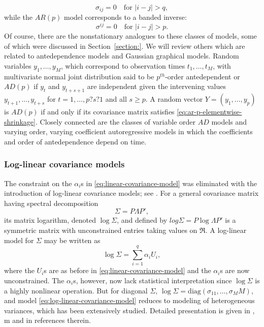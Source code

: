 \documentclass[12pt]{article}
\theoremstyle{definition}
\begin{document}
{{\begin{equation}  \label{eq:ar-p-elementwise-shrinkage}
\sigma_{ij} = 0 \quad \mbox{for }\vert i - j \vert > q, 
\end{equation}
\noindent
while the $AR(p)$ model corresponds to a banded inverse:
\begin{equation} \label{eq:ar-p-elementwise-shrinkage}
\sigma^{ij} = 0 \quad \mbox{for }\vert i - j \vert > p. 
\end{equation}
Of course, there are the nonstationary analogues to these classes of models, some of which were discussed in Section~\ref{section:}. We will review others which are related to antedependence models and Gaussian graphical models. Random variables $y_1, \dots, y_M$, which correspond to observation times $t_1,\dots, t_M$, with multivariate normal joint distribution said to be $p^{th}$-order antedependent or $AD(p)$ \citet{gabriel1962ante} if $y_t$ and $y_{t+s+1}$ are independent given the intervening values $y_{t+1}, \dots , y_{t+s}$ for $t = 1, \dots , p?s?1$ and all $s \ge p$. A random vector $Y = \left(y_1, \dots , y_p\right)$ is $AD(p)$ if and only if its covariance matrix satisfies \ref{eq:ar-p-elementwise-shrinkage}. Closely connected are the classes of variable order $AD$ models and varying order, varying coefficient autoregressive models \citet{kitagawa1985smoothness} in which the coefficients and order of antedependence depend on time. 

\subsubsection{Log-linear covariance models}

The constraint on the $\alpha_i$s in \ref{eq:linear-covariance-model} was eliminated with the introduction of log-linear covariance models; see \citet{chiu1996matrix}. For a general covariance matrix having spectral decomposition
\begin{equation}
\Sigma = P \Lambda P',
\end{equation}
\noindent
its matrix logarithm, denoted $\log\Sigma$, and defined by $log \Sigma = P \log\Lambda P'$ is a symmetric matrix with unconstrained entries taking values on $\Re$. A log-linear model for $\Sigma$ may be written as
\begin{equation} \label{eq:log-linear-covariance-model}
\log\Sigma  = \sum_{i = 1}^q \alpha_i U_i, 
\end{equation}
\noindent
where the $U_i$s are as before in \ref{eq:linear-covariance-model} and the $\alpha_i$s are now unconstrained. The $\alpha_i$s, however, now lack statistical interpretation since $\log \Sigma$ is a
highly nonlinear operation. But for diagonal $\Sigma$, $\log \Sigma = \mbox{diag}\left(\sigma_{11},\dots, \sigma_MM\right)$, and model \ref{eq:log-linear-covariance-model} reduces to modeling of heterogeneous variances, which has been extensively studied. Detailed presentation is given in \citet{carroll1988transformation}, \citet{verbyla1993modelling}m and in references therein.

}}
\end{document}

